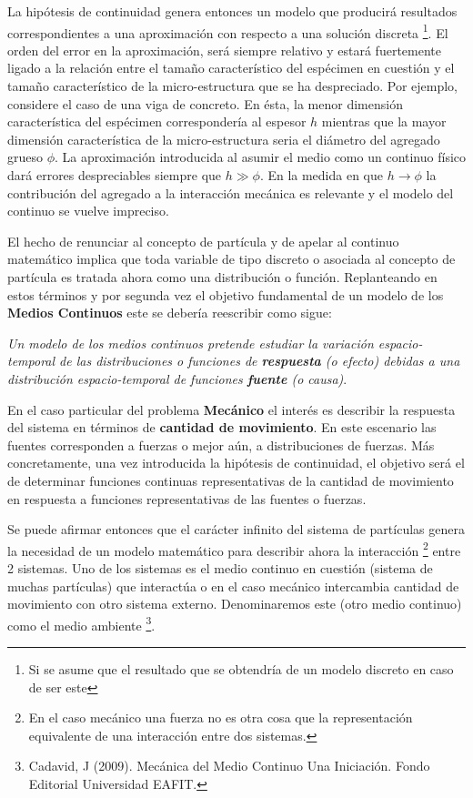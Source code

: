 \documentclass[../notas medios.tex]{subfiles}
\begin{document}
La hipótesis de continuidad genera entonces un modelo que producirá resultados correspondientes a una aproximación con respecto a una solución discreta \footnote{Si se asume que el resultado que se obtendría de un modelo discreto en caso de ser este}.  El orden del error en la aproximación, será siempre relativo y estará fuertemente ligado a la relación entre el tamaño característico del espécimen en cuestión y el tamaño característico de la micro-estructura que se ha despreciado.  Por ejemplo, considere el caso de una viga de concreto.  En ésta, la menor dimensión característica del espécimen correspondería al espesor $h$ mientras que la mayor dimensión característica de la micro-estructura seria el diámetro del agregado grueso $\phi$.  La aproximación introducida al asumir el medio como un continuo físico dará errores despreciables siempre que $h \gg \phi$.  En la medida en que $h \to \phi$   la contribución del agregado a la interacción mecánica es relevante y el modelo del continuo se vuelve impreciso.

El hecho de renunciar al concepto de partícula y de apelar al continuo matemático implica que toda variable de tipo discreto o asociada al concepto de partícula es tratada ahora como una distribución o función.  Replanteando en estos términos y por segunda vez el objetivo fundamental de un modelo de los {\bf Medios Continuos} este se debería reescribir como sigue:

\textit{Un modelo de los medios continuos pretende estudiar la variación espacio-temporal de las distribuciones o funciones de {\bf respuesta} (o efecto) debidas a una distribución espacio-temporal de funciones {\bf fuente} (o causa)}.

En el caso particular del problema {\bf Mecánico} el interés es describir la
respuesta del sistema en términos de {\bf cantidad de movimiento}.  En este escenario las fuentes corresponden a fuerzas o mejor aún, a distribuciones de fuerzas.  Más concretamente, una vez introducida la hipótesis de continuidad, el objetivo será el de determinar funciones continuas representativas de la cantidad de movimiento en respuesta a funciones representativas de las fuentes o fuerzas.

Se puede afirmar entonces que el carácter infinito del sistema de partículas genera la necesidad de un modelo matemático para describir ahora la interacción \footnote{En el caso mecánico una fuerza no es otra cosa que la representación equivalente de una interacción entre dos sistemas.} entre 2 sistemas.  Uno de los sistemas es el medio continuo en cuestión (sistema de muchas partículas) que interactúa o en el caso mecánico intercambia cantidad de movimiento con otro sistema externo.  Denominaremos este (otro medio continuo) como el medio ambiente \footnote{Cadavid, J (2009).  Mecánica del Medio Continuo Una Iniciación.  Fondo Editorial Universidad EAFIT.}.
\end{document}
